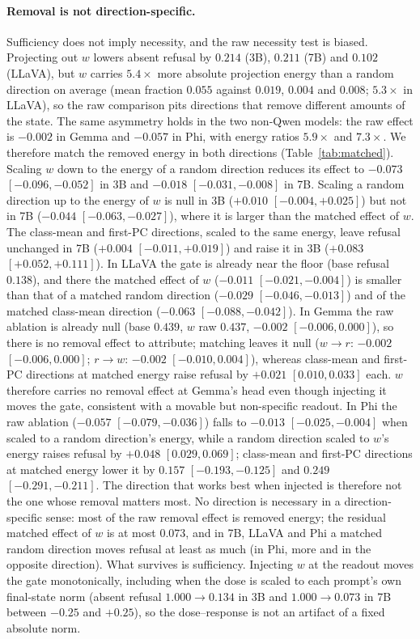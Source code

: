 \documentclass[10pt]{article}
\newcommand{\wdir}{w}
\begin{document}
\paragraph{Removal is not direction-specific.}
Sufficiency does not imply necessity, and the raw necessity test is biased. Projecting out $\wdir$ lowers absent refusal by $0.214$ (3B), $0.211$ (7B) and $0.102$ (LLaVA), but $\wdir$ carries $5.4\times$ more absolute projection energy than a random direction on average (mean fraction $0.055$ against $0.019$, $0.004$ and $0.008$; $5.3\times$ in LLaVA), so the raw comparison pits directions that remove different amounts of the state. The same asymmetry holds in the two non-Qwen models: the raw effect is $-0.002$ in Gemma and $-0.057$ in Phi, with energy ratios $5.9\times$ and $7.3\times$. We therefore match the removed energy in both directions (Table~\ref{tab:matched}). Scaling $\wdir$ down to the energy of a random direction reduces its effect to $-0.073$ $[-0.096,-0.052]$ in 3B and $-0.018$ $[-0.031,-0.008]$ in 7B. Scaling a random direction up to the energy of $\wdir$ is null in 3B ($+0.010$ $[-0.004,+0.025]$) but not in 7B ($-0.044$ $[-0.063,-0.027]$), where it is larger than the matched effect of $\wdir$. The class-mean and first-PC directions, scaled to the same energy, leave refusal unchanged in 7B ($+0.004$ $[-0.011,+0.019]$) and raise it in 3B ($+0.083$ $[+0.052,+0.111]$). In LLaVA the gate is already near the floor (base refusal $0.138$), and there the matched effect of $\wdir$ ($-0.011$ $[-0.021,-0.004]$) is smaller than that of a matched random direction ($-0.029$ $[-0.046,-0.013]$) and of the matched class-mean direction ($-0.063$ $[-0.088,-0.042]$). In Gemma the raw ablation is already null (base $0.439$, $\wdir$ raw $0.437$, $-0.002$ $[-0.006,0.000]$), so there is no removal effect to attribute; matching leaves it null ($\wdir{\to}r$: $-0.002$ $[-0.006,0.000]$; $r{\to}\wdir$: $-0.002$ $[-0.010,0.004]$), whereas class-mean and first-PC directions at matched energy raise refusal by $+0.021$ $[0.010,0.033]$ each. $\wdir$ therefore carries no removal effect at Gemma's head even though injecting it moves the gate, consistent with a movable but non-specific readout. In Phi the raw ablation ($-0.057$ $[-0.079,-0.036]$) falls to $-0.013$ $[-0.025,-0.004]$ when scaled to a random direction's energy, while a random direction scaled to $\wdir$'s energy raises refusal by $+0.048$ $[0.029,0.069]$; class-mean and first-PC directions at matched energy lower it by $0.157$ $[-0.193,-0.125]$ and $0.249$ $[-0.291,-0.211]$. The direction that works best when injected is therefore not the one whose removal matters most. No direction is necessary in a direction-specific sense: most of the raw removal effect is removed energy; the residual matched effect of $\wdir$ is at most $0.073$, and in 7B, LLaVA and Phi a matched random direction moves refusal at least as much (in Phi, more and in the opposite direction). What survives is sufficiency. Injecting $\wdir$ at the readout moves the gate monotonically, including when the dose is scaled to each prompt's own final-state norm (absent refusal $1.000\to0.134$ in 3B and $1.000\to0.073$ in 7B between $-0.25$ and $+0.25$), so the dose--response is not an artifact of a fixed absolute norm. 
\end{document}
